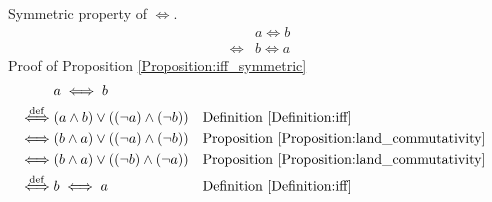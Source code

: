 \begin{prop}
\label{Proposition:iff_symmetric}
Symmetric property of $\iff$.
\begin{align*}
& a \iff b \\
\iff & b \iff a
\end{align*}
Proof of Proposition \ref{Proposition:iff_symmetric}
\begin{align*}
& a \iff b \\
\overset{\operatorname{def}}{\iff} & (a \land b) \lor ((\lnot a) \land (\lnot b))
& & \text{Definition \ref{Definition:iff}} \\
\iff & (b \land a) \lor ((\lnot a) \land (\lnot b))
& & \text{Proposition \ref{Proposition:land_commutativity}} \\
\iff & (b \land a) \lor ((\lnot b) \land (\lnot a))
& & \text{Proposition \ref{Proposition:land_commutativity}} \\
\overset{\operatorname{def}}{\iff} & b \iff a
& & \text{Definition \ref{Definition:iff}} \\
\end{align*}
\end{prop}


